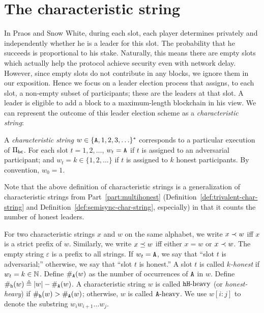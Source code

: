\section{The characteristic string}
In Praos and Snow White, 
during each slot, 
each player determines privately and independently 
whether he is a leader for this slot. 
The probability that he succeeds is proportional to his stake. 
Naturally, this means there are empty slots 
which actually help the protocol achieve 
security even with network delay. 
However, since empty slots do not contribute in any blocks, 
we ignore them in our exposition. 
Hence we focus on a leader election process that assigns, 
to each slot, 
a non-empty subset of participants; 
these are the leaders at that slot. 
A leader is eligible to add a block to a 
maximum-length blockchain in his view. 
We can represent the outcome of this leader election scheme 
as a \emph{characteristic string}:


\begin{definition}\label{def:char-string-praos}
  A \emph{characteristic string} $w \in \{\mathtt{A}, 
  1, 2, 3, \ldots \}^*$ 
  corresponds to a particular execution of $\Pi_\mathsf{bc}$.
  For each slot $t = 1, 2, \ldots$, 
  $w_t = \mathtt{A}$ if $t$ is assigned to an adversarial participant; 
  and 
  $w_t = k \in \{1,2,\ldots\}$ if $t$ is assigned to $k$ honest participants.
  By convention, $w_0 = 1$.
\end{definition}

Note that the above definition of characteristic strings 
is a generalization of characteristic strings 
from Part~\ref{part:multihonest} 
(Definition~\ref{def:trivalent-char-string} 
and Definition~\ref{def:semisync-char-string}, especially)
in that it counts the number of honest leaders. 


For two characteristic strings $x$ and $w$ on the same alphabet, 
we write $x \prec w$ iff $x$ is a strict prefix of $w$. 
Similarly, 
we write $x \preceq w$ iff either $x = w$ or $x \prec w$. 
The empty string $\varepsilon$ is a prefix to all strings. 
If $w_t = \mathtt{A}$, we say that ``slot $t$ is adversarial;'' 
otherwise, we say that ``slot $t$ is honest.'' 
A slot $t$ is called \emph{$k$-honest} if $w_t = k \in \mathbb{N}$.
Define $\#_{\mathtt{A}}(w)$ as the number of occurrences of $\mathtt{A}$ in $w$. 
Define $\#_{\mathtt{h}}(w) \triangleq |w| - \#_{\mathtt{A}}(w) 
$.
A characteristic string $w$ is called $\mathtt{h}\mathtt{H}\text{-heavy}$ (or \emph{honest-heavy}) if 
$\#_{\mathtt{h}}(w) > \#_{\mathtt{A}}(w)$; 
otherwise, $w$ is called $\mathtt{A}\text{-heavy}$. 
We use $w[i : j]$ to denote the substring $w_i w_{i+1}\ldots w_j$.

